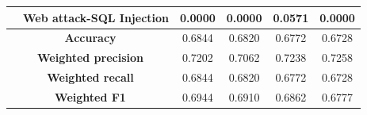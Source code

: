 \begin{table}[htbp]
\begin{tabular}{llcccc}
{{ & Web attack-SQL Injection & 0.0000 & 0.0000 & 0.0571 & 0.0000 \\
\midrule
\multicolumn{2}{c}{\textbf{Accuracy}} & 0.6844 & 0.6820 & 0.6772 & 0.6728 \\
\midrule
\multicolumn{2}{c}{\textbf{Weighted precision}} & 0.7202 & 0.7062 & 0.7238 & 0.7258 \\
\midrule
\multicolumn{2}{c}{\textbf{Weighted recall}} & 0.6844 & 0.6820 & 0.6772 & 0.6728 \\
\midrule
\multicolumn{2}{c}{\textbf{Weighted F1}} & 0.6944 & 0.6910 & 0.6862 & 0.6777 \\
\bottomrule
\end{tabular}
\end{table}
